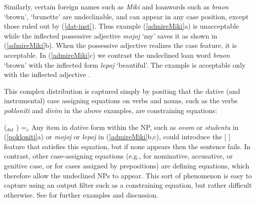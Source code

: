 \begin{sloppypar}
\noindent
  Similarly, certain foreign names such as \textit{Miki} and loanwords such as {\it braon} `brown', `brunette' are undeclinable, and can appear in any case position, except those ruled out by (\ref{dat-inst}).  Thus  example (\ref{admireMiki}a) is unacceptable while the inflected possessive
adjective {\it mojoj} `my'  saves it as shown in (\ref{admireMiki}b).   When the possessive adjective realizes the case
feature, it is acceptable.  In  (\ref{admireMiki}c) we contrast the undeclined loan word {\it
braon} `brown' with the inflected form {\it lepoj} `beautiful'.  The example is acceptable only
with the inflected adjective \citep[134]{WZ2003a}.  
\end{sloppypar}

\begin{exe} 
\ex	\label{admireMiki} 
\begin{xlist}
\end{xlist}
\end{exe}

\noindent
This complex distribution is captured simply by positing that the dative (and instrumental) case assigning equations on verbs and nouns, such as the verbs \textit{pokloniti} and \textit{divim} in the above examples, are constraining equations:

\ea
(\up {}$_{dat}$ ) =$_c$ 
\z
Any item in dative form within the NP, such as \textit{ovom} or \textit{studentu} in (\ref{pokloniti}a) or \textit{mojoj} or \textit{lepoj} in (\ref{admireMiki}b,c), could introduce the [ ] feature that satisfies this equation, but if none appears then the sentence fails.  In contrast, other case-assigning equations (e.g., for nominative, accusative, or genitive case, or for cases assigned by prepositions) are defining equations, which therefore allow the undeclined NPs to appear.  This sort of phenomenon is easy to capture using an output filter such as a constraining equation, but rather difficult otherwise.  See \citet{wechsler2001case} for further examples and discussion.  

